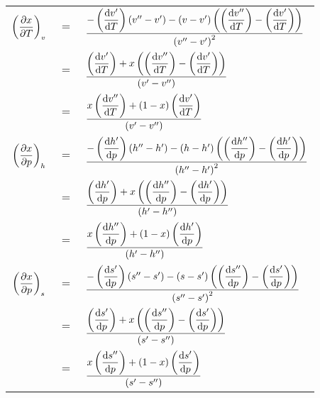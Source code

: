 {\setlength{\tabcolsep}{.2em}
\begin{tabularx}{\linewidth}{ccl}
\toprule
$\der{x}{T}{v}$ 
	& $=$ & $\dfrac{-\DER{v'}{T}\left(v''-v'\right) - \left(v-v'\right)\left(\DER{v''}{T}-\DER{v'}{T}\right)}{\left(v''-v'\right)^2}$\\[15pt]
	& $=$ & $\dfrac{ \DER{v'}{T}+x\left(\DER{v''}{T}-\DER{v'}{T}\right)}{\left(v'-v''\right)}$\\[15pt]
	& $=$ & $\dfrac{x\DER{v''}{T}+\left(1-x\right)\DER{v'}{T}}{\left(v'-v''\right)}$ \\[15pt]
%
\midrule
$\der{x}{p}{h}$ 
	& $=$ & $\dfrac{-\DER{h'}{p}\left(h''-h'\right) - \left(h-h'\right)\left(\DER{h''}{p}-\DER{h'}{p}\right)}{\left(h''-h'\right)^2}$\\[15pt]
	& $=$ & $\dfrac{\DER{h'}{p}+x\left(\DER{h''}{p}-\DER{h'}{p}\right)}{\left(h'-h''\right)}$\\[15pt]
	& $=$ & $\dfrac{x\DER{h''}{p}+\left(1-x\right)\DER{h'}{p}}{\left(h'-h''\right)}$\\[15pt]
\midrule
$\der{x}{p}{s}$ 
	& $=$ & $\dfrac{-\DER{s'}{p}\left(s''-s'\right) - \left(s-s'\right)\left(\DER{s''}{p}-\DER{s'}{p}\right)}{\left(s''-s'\right)^2}$\\[15pt]
	& $=$ & $\dfrac{\DER{s'}{p}+x\left(\DER{s''}{p}-\DER{s'}{p}\right)}{\left(s'-s''\right)}$\\[15pt]
	& $=$ & $\dfrac{x\DER{s''}{p}+\left(1-x\right)\DER{s'}{p}}{\left(s'-s''\right)}$\\[15pt]
%
\bottomrule
\end{tabularx}%
}
